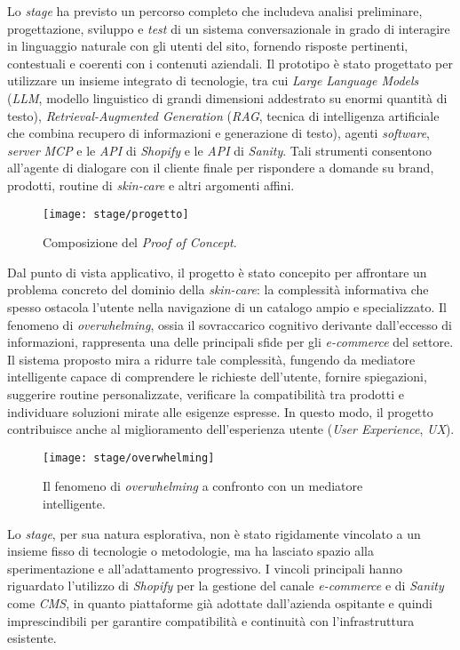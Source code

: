 Lo \emph{stage} ha previsto un percorso completo che includeva analisi preliminare, progettazione, sviluppo e \emph{test} di un sistema conversazionale in grado di 
interagire in linguaggio naturale con gli utenti del sito, fornendo risposte pertinenti, contestuali e coerenti con i contenuti aziendali. 
Il prototipo è stato progettato per utilizzare un insieme integrato di tecnologie, tra cui \emph{Large Language Models} (\emph{LLM}, modello linguistico di grandi dimensioni addestrato su enormi quantità di testo), \emph{Retrieval-Augmented Generation} (\emph{RAG}, tecnica di intelligenza artificiale che combina recupero di informazioni e generazione di testo), 
agenti \emph{software}, \emph{server} \emph{MCP} e le \emph{API} di \emph{Shopify} e le \emph{API} di \emph{Sanity}. 
Tali strumenti consentono all’agente di dialogare con il cliente finale per rispondere a domande su brand, prodotti, routine di \emph{skin-care} e altri argomenti affini.
\begin{figure}[H]
    \centering
    \texttt{[image: stage/progetto]}
    \caption{Composizione del \emph{Proof of Concept}.}
    \label{fig:progetto}
  \end{figure}
Dal punto di vista applicativo, il progetto è stato concepito per affrontare un problema concreto del dominio della \emph{skin-care}: la complessità informativa 
che spesso ostacola l’utente nella navigazione di un catalogo ampio e specializzato. 
Il fenomeno di \emph{overwhelming}, ossia il sovraccarico cognitivo derivante dall’eccesso di informazioni, rappresenta una delle principali sfide per gli \emph{e-commerce} del settore. 
Il sistema proposto mira a ridurre tale complessità, fungendo da mediatore intelligente capace di comprendere le richieste dell’utente, fornire spiegazioni, suggerire routine personalizzate, 
verificare la compatibilità tra prodotti e individuare soluzioni mirate alle esigenze espresse. 
In questo modo, il progetto contribuisce anche al miglioramento dell’esperienza utente (\emph{User Experience}, \emph{UX}).
\begin{figure}[H]
    \centering
    \texttt{[image: stage/overwhelming]}
    \caption{Il fenomeno di \emph{overwhelming} a confronto con un mediatore intelligente.}
    \label{fig:overwhelming}
  \end{figure}
Lo \emph{stage}, per sua natura esplorativa, non è stato rigidamente vincolato a un insieme fisso di tecnologie o metodologie, ma ha lasciato spazio alla 
sperimentazione e all’adattamento progressivo. 
I vincoli principali hanno riguardato l’utilizzo di \emph{Shopify} per la gestione del canale \emph{e-commerce} e di \emph{Sanity} 
come \emph{CMS}, in quanto piattaforme già adottate dall’azienda ospitante e quindi imprescindibili per garantire compatibilità e continuità con l’infrastruttura esistente.

